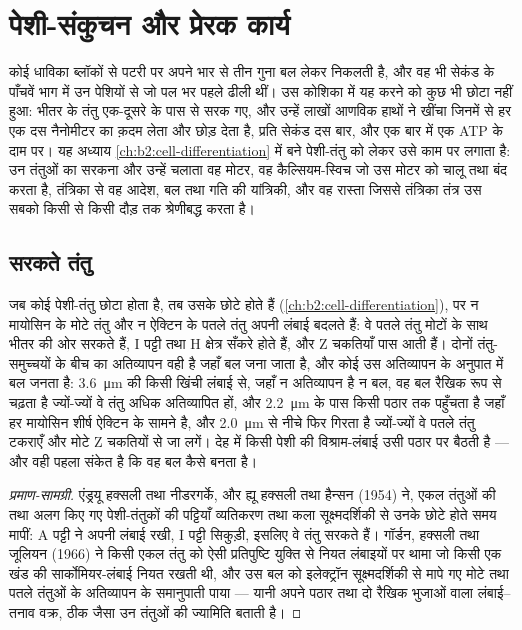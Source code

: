 \chapter{पेशी-संकुचन और प्रेरक कार्य}\label{ch:b2:muscle-movement}

कोई धाविका ब्लॉकों से पटरी पर अपने भार से तीन गुना बल लेकर निकलती
है, और वह भी सेकंड के पाँचवें भाग में उन पेशियों से जो
पल भर पहले ढीली थीं। उस कोशिका में यह करने को कुछ भी छोटा नहीं हुआ:
भीतर के तंतु एक-दूसरे के पास से सरक गए, और उन्हें लाखों
आणविक हाथों ने खींचा जिनमें से हर एक दस नैनोमीटर का क़दम लेता और छोड़
देता है, प्रति सेकंड दस बार, और एक बार में एक ATP के दाम पर। यह अध्याय
\cref{ch:b2:cell-differentiation} में बने पेशी-तंतु को लेकर
उसे काम पर लगाता है: उन तंतुओं का सरकना और उन्हें चलाता वह मोटर,
वह कैल्सियम-स्विच जो उस मोटर को चालू तथा बंद करता है,
तंत्रिका से वह आदेश, बल तथा गति की यांत्रिकी, और वह रास्ता जिससे
तंत्रिका तंत्र उस सबको किसी  से किसी
दौड़ तक श्रेणीबद्ध करता है।

\section{सरकते तंतु}

\begin{proposition}[सरकते-तंतु क्रियाविधि]\label{prop:b2:muscle-movement:sliding}
जब कोई पेशी-तंतु छोटा होता है, तब उसके  छोटे होते हैं
(\cref{ch:b2:cell-differentiation}), पर न मायोसिन के मोटे तंतु
और न ऐक्टिन के पतले तंतु अपनी लंबाई बदलते हैं: वे पतले
तंतु मोटों के साथ भीतर की ओर सरकते हैं, I पट्टी तथा H
क्षेत्र सँकरे होते हैं, और Z चकतियाँ पास आती हैं। दोनों
तंतु-समुच्चयों के बीच का अतिव्यापन वही है जहाँ बल जना जाता है, और कोई 
उस अतिव्यापन के अनुपात में बल जनता है: \qty{3.6}{\micro m} की किसी
खिंची लंबाई से, जहाँ न अतिव्यापन है न बल, वह
बल रैखिक रूप से चढ़ता है ज्यों-ज्यों वे तंतु अधिक अतिव्यापित हों, और \qty{2.2}{\micro m}
के पास किसी पठार तक पहुँचता है जहाँ हर मायोसिन शीर्ष ऐक्टिन के सामने है,
और \qty{2.0}{\micro m} से नीचे फिर गिरता है ज्यों-ज्यों वे पतले तंतु
टकराएँ और मोटे Z चकतियों से जा लगें। देह में किसी
पेशी की विश्राम-लंबाई उसी पठार पर बैठती है --- और वही पहला संकेत है
कि वह बल कैसे बनता है।
\end{proposition}
\begin{proof}[प्रमाण-सामग्री]
एंड्रयू हक्सली तथा नीडरगर्के, और ह्यू हक्सली तथा हैन्सन (1954) ने,
एकल तंतुओं की तथा अलग किए गए पेशी-तंतुकों की पट्टियाँ
व्यतिकरण तथा कला सूक्ष्मदर्शिकी से उनके छोटे होते समय मापीं: A पट्टी ने
अपनी लंबाई रखी, I पट्टी सिकुड़ी, इसलिए वे तंतु सरकते हैं। गॉर्डन,
हक्सली तथा जूलियन (1966) ने किसी एकल तंतु को ऐसी प्रतिपुष्टि युक्ति से नियत
लंबाइयों पर थामा जो किसी एक खंड की सार्कोमियर-लंबाई नियत रखती थी,
और उस बल को इलेक्ट्रॉन सूक्ष्मदर्शिकी से मापे गए मोटे तथा
पतले तंतुओं के अतिव्यापन के समानुपाती पाया --- यानी अपने पठार तथा दो रैखिक भुजाओं वाला
लंबाई--तनाव वक्र, ठीक जैसा उन तंतुओं की ज्यामिति
बताती है।
\end{proof}

